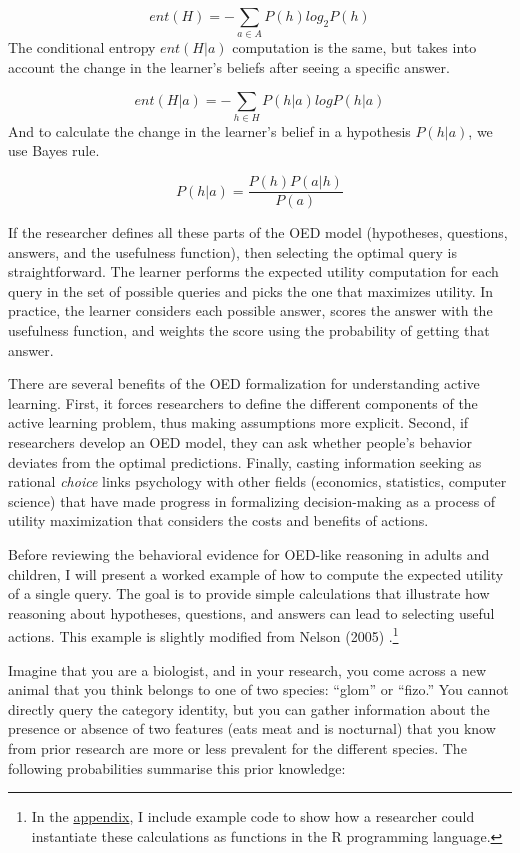 \documentclass[english,floatsintext,man]{apa6}
\theoremstyle{definition}
\theoremstyle{definition}
\theoremstyle{definition}
\theoremstyle{remark}
\begin{document}
\[ent(H) = -\sum_{a\in A}{P(h)log_2P(h)}\] \noindent
The conditional entropy \(ent(H|a)\) computation is the same, but takes
into account the change in the learner's beliefs after seeing a specific
answer.

\[ ent(H|a) = -\sum_{h\in H}{P(h|a)logP(h|a)} \] \noindent
And to calculate the change in the learner's belief in a hypothesis
\(P(h|a)\), we use Bayes rule.

\[ P(h|a) = \frac{P(h)P(a|h)}{P(a)} \]

\noindent
If the researcher defines all these parts of the OED model (hypotheses,
questions, answers, and the usefulness function), then selecting the
optimal query is straightforward. The learner performs the expected
utility computation for each query in the set of possible queries and
picks the one that maximizes utility. In practice, the learner considers
each possible answer, scores the answer with the usefulness function,
and weights the score using the probability of getting that answer.

There are several benefits of the OED formalization for understanding
active learning. First, it forces researchers to define the different
components of the active learning problem, thus making assumptions more
explicit. Second, if researchers develop an OED model, they can ask
whether people's behavior deviates from the optimal predictions.
Finally, casting information seeking as rational \emph{choice} links
psychology with other fields (economics, statistics, computer science)
that have made progress in formalizing decision-making as a process of
utility maximization that considers the costs and benefits of actions.

Before reviewing the behavioral evidence for OED-like reasoning in
adults and children, I will present a worked example of how to compute
the expected utility of a single query. The goal is to provide simple
calculations that illustrate how reasoning about hypotheses, questions,
and answers can lead to selecting useful actions. This example is
slightly modified from Nelson (2005) .\footnote{In the
  \protect\hyperlink{app}{appendix}, I include example code to show how
  a researcher could instantiate these calculations as functions in the
  R programming language.}

Imagine that you are a biologist, and in your research, you come across
a new animal that you think belongs to one of two species:
\enquote{glom} or \enquote{fizo.} You cannot directly query the category
identity, but you can gather information about the presence or absence
of two features (eats meat and is nocturnal) that you know from prior
research are more or less prevalent for the different species. The
following probabilities summarise this prior knowledge:
\end{document}
